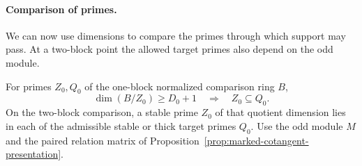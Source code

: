 \paragraph{Comparison of primes.}
We can now use dimensions to compare the primes through which support may pass. At a
two-block point the allowed target primes also depend on the odd module.

\begin{proposition}
\label{prop:marked-stable-prime-inclusion}
For primes \(Z_0,Q_0\) of the one-block normalized comparison ring \(B\),
\[
      \dim(B/Z_0)\ge D_0+1\quad\Longrightarrow\quad Z_0\subseteq Q_0 .
\]
On the two-block comparison, a stable prime \(Z_0\) of that
quotient dimension lies in each of the admissible stable or
thick target primes \(Q_0\). Use the odd module \(M\) and the paired relation
matrix of Proposition~\ref{prop:marked-cotangent-presentation}.
\end{proposition}

